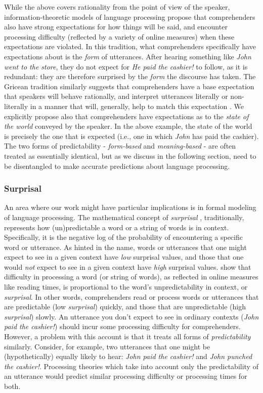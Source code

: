 While the above covers rationality from the point of view of the
speaker, information-theoretic models of language processing propose
that comprehenders also have strong expectations for how things will be
said, and encounter processing difficulty (reflected by a variety of
online measures) when these expectations are violated. In this
tradition, what comprehenders specifically have expectations about is
the \emph{form} of utterances. After hearing something like \emph{John
went to the store}, they do not expect for \emph{He paid the cashier!}
to follow, as it is redundant: they are therefore surprised by the
\emph{form} the discourse has taken. The Gricean tradition similarly
suggests that comprehenders have a base expectation that speakers will
behave rationally, and interpret utterances literally or non-literally
in a manner that will, generally, help to match this expectation \citep{Grice1975, Levinson2000}. We explicitly propose also that comprehenders
have expectations as to the \emph{state of the world} conveyed by the
speaker. In the above example, the state of the world is precisely the
one that is expected (i.e., one in which \emph{John} has paid the
cashier). The two forms of predictability - \emph{form-based} and
\emph{meaning-based} - are often treated as essentially identical, but
as we discuss in the following section, need to be disentangled to make
accurate predictions about language processing.

\subsubsection{Surprisal}\label{surprisal}

An area where our work might have particular implications is in formal
modeling of language processing. The mathematical concept of
\emph{surprisal} \citep{Hale2001, Levy2008}, traditionally, represents how
(un)predictable a word or a string of words is in context. Specifically,
it is the negative log of the probability of encountering a specific
word or utterance. As hinted in the name, words or utterances that one
might expect to see in a given context have \emph{low} surprisal values,
and those that one would \emph{not} expect to see in a given context
have \emph{high} surprisal values. \citet{Smith2013} show that
difficulty in processing a word (or string of words), as reflected in
online measures like reading times, is proportional to the word's
unpredictability in context, or \emph{surprisal}. In other words,
comprehenders read or process words or utterances that are predictable
(low \emph{surprisal}) quickly, and those that are unpredictable (high
\emph{surprisal}) slowly. An utterance you don't expect to see in
ordinary contexts (\emph{John paid the cashier!}) should incur some
processing difficulty for comprehenders. However, a problem with this
account is that it treats all forms of \emph{predictability} similarly.
Consider, for example, two utterances that one might be (hypothetically)
equally likely to hear: \emph{John paid the cashier!} and \emph{John
punched the cashier!}. Processing theories which take into account only
the predictability of an utterance would predict similar processing
difficulty or processing times for both.

